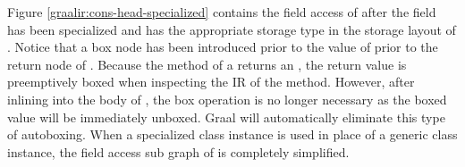 Figure \ref{graalir:cons-head-specialized} contains the field access of  after the field has been specialized and has the appropriate storage type in the storage layout of .
Notice that a box node has been introduced prior to the value of  prior to the return node of .
Because the  method of a  returns an , the return value is preemptively boxed when inspecting the IR of the method.
However, after inlining into the body of , the box operation is no longer necessary as the boxed value will be immediately unboxed.
Graal will automatically eliminate this type of autoboxing.
When a specialized class instance is used in place of a generic class instance, the field access sub graph of  is completely simplified.